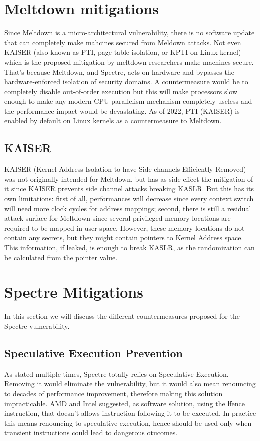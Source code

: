 \section{Meltdown mitigations}
Since Meltdown is a micro-architectural vulnerability, there is no software update that can completely make mahcines secured from Meldown attacks.
Not even KAISER (also known as PTI, page-table isolation, or KPTI on Linux kernel) which is the proposed
mitigation by meltdown researchers make machines secure. That's because
Meltdown, and Spectre, acts on hardware and bypasses the hardware-enforced isolation of security domains.
A countermeasure would be to completely disable out-of-order execution but this will make processors slow enough to make any modern CPU parallelism mechanism
completely useless and the performance impact would be devastating. As of 2022, PTI (KAISER) is enabled by default on Linux kernels as a countermeasure to Meltdown.

\subsection{KAISER}
KAISER (Kernel Address Isolation to have Side-channels Efficiently Removed) was not originally intended for Meltdown, but has as side effect the mitigation of it
since KAISER prevents side channel attacks breaking KASLR. But this has its own limitations: first of all, performances will decrease since every context switch will
need more clock cycles for address mappings; second, there is still a residual attack surface for Meltdown since several privileged memory locations are required
to be mapped in user space. However, these memory locations do not contain any secrets, but they might contain pointers to Kernel Address space. This information, if leaked,
is enough to break KASLR, as the randomization can be calculated from the pointer value.

\section{Spectre Mitigations}
In this section we will discuss the different countermeasures proposed for the Spectre vulnerability.
\subsection{Speculative Execution Prevention}
As stated multiple times, Spectre totally relies on Speculative Execution. 
Removing it would eliminate the vulnerability, but it would also mean renouncing to decades of performance improvement, therefore making this solution impracticable.
AMD and Intel suggested, as software solution, using the lfence instruction, that doesn't allows instruction following it to be executed.
In practice this means renouncing to speculative execution, hence should be used only when transient instructions could lead to dangerous otucomes.
